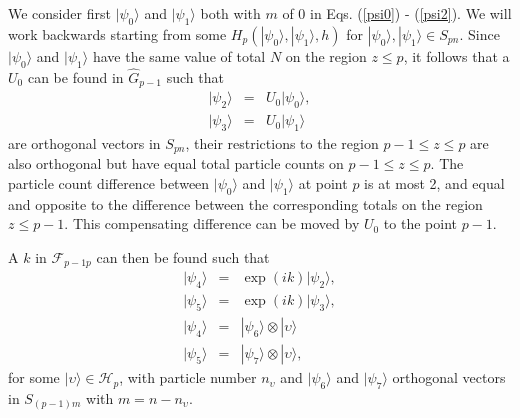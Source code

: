 \documentclass[twocolumn,amsmath,amssymb]{revtex4-1}
\begin{document}
We consider first $|\psi_0 \rangle $ and $|\psi_1 \rangle $ both with $m$ of 0 in Eqs. (\ref{psi0}) - (\ref{psi2}).
We will work backwards starting from some $H_p( |\psi_0 \rangle , |\psi_1 \rangle , h)$ for $|\psi_0 \rangle , |\psi_1 \rangle  \in S_{p n}$.
Since $|\psi_0 \rangle $ and $|\psi_1 \rangle $ have the same value of total $N$ on the region
$z \le p$, 
it follows that
a $U_0$ can be found in $\hat{G}_{p-1}$ such that
\begin{subequations}
\begin{eqnarray}
\label{u0psi0}
|\psi_2 \rangle  & = & U_0 |\psi_0 \rangle , \\
\label{u0psi1}
|\psi_3 \rangle  & = & U_0 |\psi_1 \rangle 
\end{eqnarray}
\end{subequations}
are orthogonal vectors in $S_{p n}$, their restrictions
to the region $p-1 \le z \le p$ are also orthogonal
but have equal total particle counts 
on $p-1 \le z \le p$.
The particle count difference 
between $|\psi_0 \rangle $ and $|\psi_1 \rangle $ at point $p$ is at most
2, and equal and opposite to the difference between the corresponding
totals on the region $z \le p-1$. This compensating difference can be
moved by $U_0$ to the point $p -1$.

A $k$ in $\mathcal{F}_{p-1 p}$ can
then be found such that
\begin{subequations}
\begin{eqnarray}
\label{u1psi2}
|\psi_4 \rangle  & = & \exp( i k) |\psi_2 \rangle , \\
\label{u1psi3}
|\psi_5 \rangle  & = & \exp( i k)|\psi_3 \rangle , \\
\label{phi4}
|\psi_4 \rangle  & = & |\psi_6 \rangle  \otimes |\upsilon \rangle  \\
\label{phi5}
|\psi_5 \rangle  & = & |\psi_7 \rangle  \otimes |\upsilon \rangle ,
\end{eqnarray}
\end{subequations}
for some $|\upsilon \rangle  \in \mathcal{H}_p$, with particle number $n_{\upsilon}$ and
$|\psi_6 \rangle $ and $|\psi_7 \rangle $ orthogonal vectors in $S_{(p-1) m}$ with $m = n - n_{\upsilon}$.
\end{document}

